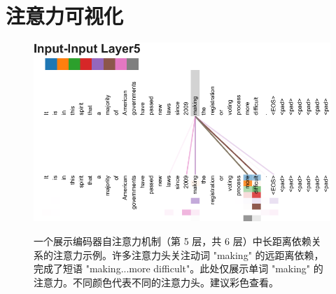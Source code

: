 \pagebreak
\section*{注意力可视化}\label{sec:viz-att}
\begin{figure}[h]
{\includegraphics[width=\textwidth, trim=0 0 0 36, clip]{./vis/making_more_difficult5_new.pdf}}
\caption{一个展示编码器自注意力机制（第 5 层，共 6 层）中长距离依赖关系的注意力示例。许多注意力头关注动词 "making" 的远距离依赖，完成了短语 "making...more difficult"。此处仅展示单词 "making" 的注意力。不同颜色代表不同的注意力头。建议彩色查看。}
\end{figure}

